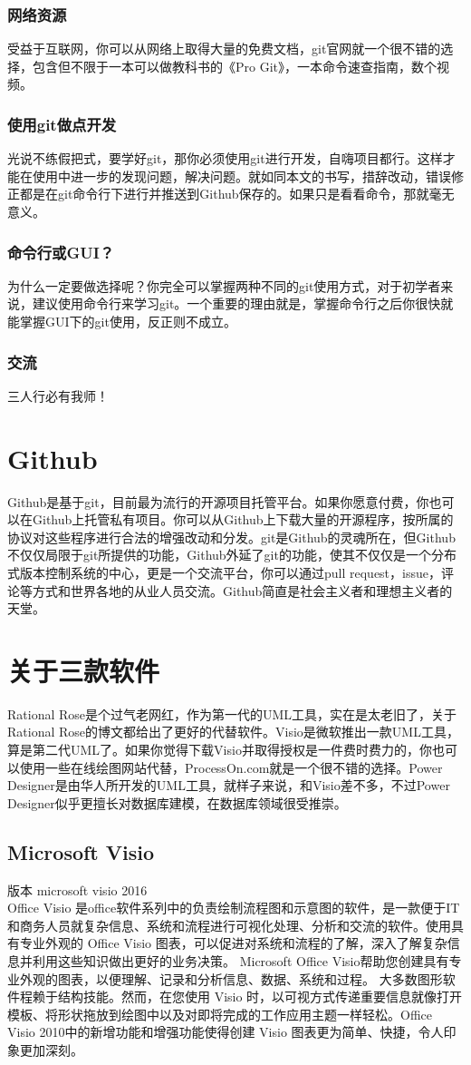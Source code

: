 \documentclass{article}
\begin{document}
	\subsubsection{网络资源}
	受益于互联网，你可以从网络上取得大量的免费文档，git官网就一个很不错的选择，包含但不限于一本可以做教科书的《Pro Git》，一本命令速查指南，数个视频。
	\subsubsection{使用git做点开发}
	光说不练假把式，要学好git，那你必须使用git进行开发，自嗨项目都行。这样才能在使用中进一步的发现问题，解决问题。就如同本文的书写，措辞改动，错误修正都是在git命令行下进行并推送到Github保存的。如果只是看看命令，那就毫无意义。
	\subsubsection{命令行或GUI？}
	为什么一定要做选择呢？你完全可以掌握两种不同的git使用方式，对于初学者来说，建议使用命令行来学习git。一个重要的理由就是，掌握命令行之后你很快就能掌握GUI下的git使用，反正则不成立。
	\subsubsection{交流}
	三人行必有我师！
	\section{Github}
	Github是基于git，目前最为流行的开源项目托管平台。如果你愿意付费，你也可以在Github上托管私有项目。你可以从Github上下载大量的开源程序，按所属的协议对这些程序进行合法的增强改动和分发。git是Github的灵魂所在，但Github不仅仅局限于git所提供的功能，Github外延了git的功能，使其不仅仅是一个分布式版本控制系统的中心，更是一个交流平台，你可以通过pull request，issue，评论等方式和世界各地的从业人员交流。Github简直是社会主义者和理想主义者的天堂。
	\section{关于三款软件}
	Rational Rose是个过气老网红，作为第一代的UML工具，实在是太老旧了，关于Rational Rose的博文都给出了更好的代替软件。Visio是微软推出一款UML工具，算是第二代UML了。如果你觉得下载Visio并取得授权是一件费时费力的，你也可以使用一些在线绘图网站代替，ProcessOn.com就是一个很不错的选择。Power Designer是由华人所开发的UML工具，就样子来说，和Visio差不多，不过Power Designer似乎更擅长对数据库建模，在数据库领域很受推崇。
	\subsection{Microsoft Visio}
	版本 microsoft visio 2016\\
	Office Visio 是office软件系列中的负责绘制流程图和示意图的软件，是一款便于IT和商务人员就复杂信息、系统和流程进行可视化处理、分析和交流的软件。使用具有专业外观的 Office Visio 图表，可以促进对系统和流程的了解，深入了解复杂信息并利用这些知识做出更好的业务决策。
	Microsoft Office Visio帮助您创建具有专业外观的图表，以便理解、记录和分析信息、数据、系统和过程。
	大多数图形软件程赖于结构技能。然而，在您使用 Visio 时，以可视方式传递重要信息就像打开模板、将形状拖放到绘图中以及对即将完成的工作应用主题一样轻松。Office Visio 2010中的新增功能和增强功能使得创建 Visio 图表更为简单、快捷，令人印象更加深刻。
\end{document}
